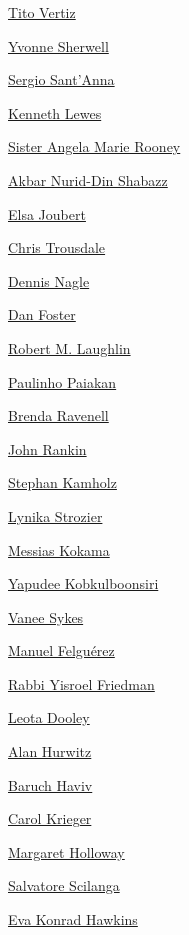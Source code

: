 \protect\hyperlink{tito-vertiz}{Tito Vertiz}

\protect\hyperlink{yvonne-sherwell}{Yvonne Sherwell}

\protect\hyperlink{sergio-santanna}{Sergio Sant'Anna}

\protect\hyperlink{kenneth-lewes}{Kenneth Lewes}

\protect\hyperlink{sister-angela-marie-rooney}{Sister Angela Marie
Rooney}

\protect\hyperlink{akbar-nuriddin-shabazz}{Akbar Nurid-Din Shabazz}

\protect\hyperlink{elsa-joubert}{Elsa Joubert}

\protect\hyperlink{chris-trousdale}{Chris Trousdale}

\protect\hyperlink{dennis-nagle}{Dennis Nagle}

\protect\hyperlink{dan-foster}{Dan Foster}

\protect\hyperlink{robert-m-laughlin}{Robert M. Laughlin}

\protect\hyperlink{paulinho-paiakan}{Paulinho Paiakan}

\protect\hyperlink{brenda-ravenell}{Brenda Ravenell}

\protect\hyperlink{john-rankin}{John Rankin}

\protect\hyperlink{stephan-kamholz}{Stephan Kamholz}

\protect\hyperlink{-lynika-strozier-}{Lynika Strozier}

\protect\hyperlink{messias-kokama}{Messias Kokama}

\protect\hyperlink{yapudee-kobkulboonsiri}{Yapudee Kobkulboonsiri}

\protect\hyperlink{vanee-sykes}{Vanee Sykes}

\protect\hyperlink{manuel-felguuxe9rez}{Manuel Felguérez}

\protect\hyperlink{rabbi-yisroel-friedman}{Rabbi Yisroel Friedman}

\protect\hyperlink{leota-dooley}{Leota Dooley}

\protect\hyperlink{alan-hurwitz}{Alan Hurwitz}

\protect\hyperlink{baruch-haviv}{Baruch Haviv}

\protect\hyperlink{carol-krieger}{Carol Krieger}

\protect\hyperlink{margaret-holloway}{Margaret Holloway}

\protect\hyperlink{salvatore-scilanga}{Salvatore Scilanga}

\protect\hyperlink{eva-konrad-hawkins}{Eva Konrad Hawkins}

